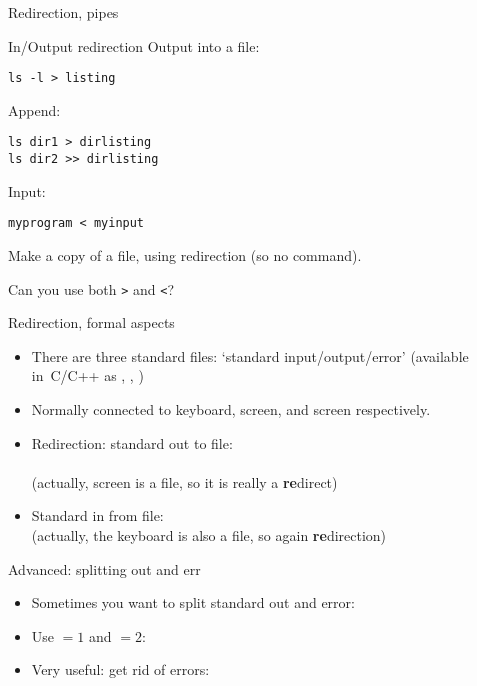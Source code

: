 \documentclass[11pt,headernav]{beamer}
\begin{document}
 {Redirection, pipes}

\begin{numberedframe}{In/Output redirection}
Output into a file:
\begin{verbatim}
ls -l > listing
\end{verbatim}
Append:
\begin{verbatim}
ls dir1 > dirlisting  
ls dir2 >> dirlisting  
\end{verbatim}
Input:
\begin{verbatim}
myprogram < myinput
\end{verbatim}
\end{numberedframe}

\begin{exercise}{}
  Make a copy of a file, using redirection (so no  command).

  Can you use both \verb+>+ and \verb+<+?
\end{exercise}

\begin{numberedframe}{Redirection, formal aspects}
  \label{sl-lnx:redirect}
  \begin{itemize}
  \item There are three standard files: `standard input/output/error'
    (available in~C/C++ as , , )
  \item Normally connected to keyboard, screen, and screen respectively.
  \item Redirection: standard out to file:\\
    \\
    (actually, screen is a file, so it is really a \textbf{re}direct)
  \item Standard in from file:
    \\
    (actually, the keyboard is also a file, so again \textbf{re}direction)
  \end{itemize}
\end{numberedframe}

\begin{numberedframe}{Advanced: splitting out and err}
  \label{sl-lnx:stderr}
  \begin{itemize}
  \item Sometimes you want to split standard out and error:
  \item Use $=1$ and $=2$:\\
  \item Very useful: get rid of errors:\\
  \end{itemize}
\end{numberedframe}
\end{document}
